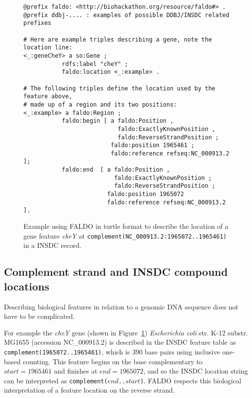 %
\begin{figure}
\begin{shaded}
\small
\begin{verbatim} 
@prefix faldo: <http://biohackathon.org/resource/faldo#> .
@prefix ddbj-.... : examples of possible DDBJ/INSDC related prefixes

# Here are example triples describing a gene, note the location line:
<_:geneCheY> a so:Gene ;
           rdfs:label "cheY" ;
           faldo:location <_:example> .

# The following triples define the location used by the feature above,
# made up of a region and its two positions:
<_:example> a faldo:Region ;
           faldo:begin [ a faldo:Position ,
                           faldo:ExactlyKnownPosition ,
                           faldo:ReverseStrandPosition ;
                         faldo:position 1965461 ;
                         faldo:reference refseq:NC_000913.2 ];
           faldo:end  [ a faldo:Position ,
                          faldo:ExactlyKnownPosition ;
                          faldo:ReverseStrandPosition ;
                        faldo:position 1965072
                        faldo:reference refseq:NC_000913.2 ].
\end{verbatim}
\end{shaded}
\caption{Example using FALDO in turtle format to describe the location of a 
gene feature \textit{chrY} at \texttt{complement(NC\_000913.2:1965072..1965461)} in a INSDC record.}
\label{fig:insdcComplement}
\end{figure}


\subsection*{Complement strand and INSDC compound locations}

Describing biological features in relation to a genomic DNA sequence does not have to be complicated.

For example the \textit{cheY} gene (shown in Figure~\ref{fig:insdcComplement})
\textit{Escherichia coli} str. K-12 substr. MG1655 (accession NC\_000913.2)
is described in the INSDC feature table as \texttt{complement(1965072..1965461)},
which is 390 base pairs using inclusive one-based counting.
This feature begins on the base complementary to $start = 1965461$
and finishes at $end = 1965072$, and so the INSDC location string
can be interpreted as \texttt{complement($end$..$start$)}.
FALDO respects this biological interpretation of a feature location
on the reverse strand.

